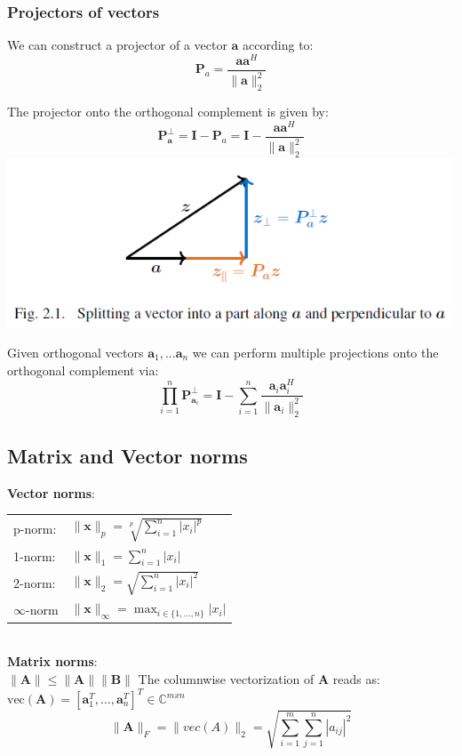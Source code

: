 \documentclass[english]{latex4ei/latex4ei_sheet}
\begin{document}
\begin{sectionbox}
\subsubsection{Projectors of vectors}
We can construct a projector of a vector $\mathbf{a}$ according to:
$$\mathbf{P}_a = \frac{\mathbf{a}\mathbf{a}^H}{\parallel\mathbf{a}\parallel^2_2}$$

The projector onto the orthogonal complement is given by:
$$\mathbf{P}^\perp_\mathbf{a} = \mathbf{I}-\mathbf{P}_a = \mathbf{I} - \frac{\mathbf{a}\mathbf{a}^H}{\parallel\mathbf{a}\parallel^2_2}$$
\includegraphics[width=\textwidth]{img/vector_decomp.png}

Given orthogonal vectors $\mathbf{a}_1, ... \mathbf{a}_n$ we can perform multiple projections onto the orthogonal complement via:\\
$$\prod_{i=1}^n \mathbf{P}_{\mathbf{a}_i}^\perp = \mathbf{I} - \sum_{i=1}^{n}\frac{\mathbf{a}_i\mathbf{a}_i^H}{\parallel\mathbf{a}_i\parallel^2_2}$$
\end{sectionbox}
\begin{sectionbox}
\subsection{Matrix and Vector norms}
\textbf{Vector norms}:\\

\begin{tabular*}{\columnwidth}{ll}
	p-norm: & $\parallel\mathbf{x}\parallel_p = \sqrt[p]{\sum_{i=1}^{n} |x_i|^p}$\\
	1-norm: & $\parallel\mathbf{x}\parallel_1 = \sum_{i=1}^{n} |x_i|$\\
	2-norm: & $\parallel\mathbf{x}\parallel_2 = \sqrt{\sum_{i=1}^{n} |x_i|^2}$\\
	$\infty$-norm & $\parallel\mathbf{x}\parallel_\infty = \max_{i\in\{1,...,n\}} |x_i|$\\
\end{tabular*}\\

\textbf{Matrix norms}:\\
$\parallel \mathbf{A}\parallel \leq \parallel \mathbf{A}\parallel \parallel\mathbf{B}\parallel$
The columnwise vectorization of $\mathbf{A}$ reads as:\\
$\text{vec}(\mathbf{A}) = [\mathbf{a}_1^T, ...,\mathbf{a}_n^T]^T\in\mathbb{C}^{mxn}$\\

$$\parallel\mathbf{A}\parallel_F = \parallel vec(A)\parallel_2 = \sqrt{\sum_{i=1}^{m}\sum_{j=1}^{n} |a_{ij}|^2}$$
\end{sectionbox}
\end{document}

